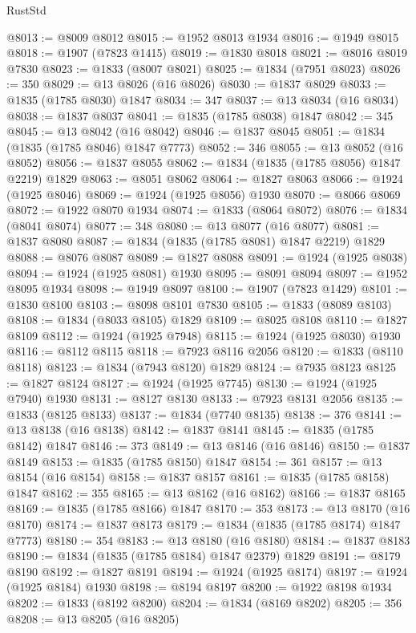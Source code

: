 \begin{lexlean}{RustStd}
\begin{coremodule}
{\begin{coremodule}
{{{{{@8013 := @8009 @8012
@8015 := @1952 @8013 @1934
@8016 := @1949 @8015
@8018 := @1907 (@7823 @1415)
@8019 := @1830 @8018
@8021 := @8016 @8019 @7830
@8023 := @1833 (@8007 @8021)
@8025 := @1834 (@7951 @8023)
@8026 := 350
@8029 := @13 @8026 (@16 @8026)
@8030 := @1837 @8029
@8033 := @1835 (@1785 @8030) @1847
@8034 := 347
@8037 := @13 @8034 (@16 @8034)
@8038 := @1837 @8037
@8041 := @1835 (@1785 @8038) @1847
@8042 := 345
@8045 := @13 @8042 (@16 @8042)
@8046 := @1837 @8045
@8051 := @1834 (@1835 (@1785 @8046) @1847 @7773)
@8052 := 346
@8055 := @13 @8052 (@16 @8052)
@8056 := @1837 @8055
@8062 := @1834 (@1835 (@1785 @8056) @1847 @2219) @1829
@8063 := @8051 @8062
@8064 := @1827 @8063
@8066 := @1924 (@1925 @8046)
@8069 := @1924 (@1925 @8056) @1930
@8070 := @8066 @8069
@8072 := @1922 @8070 @1934
@8074 := @1833 (@8064 @8072)
@8076 := @1834 (@8041 @8074)
@8077 := 348
@8080 := @13 @8077 (@16 @8077)
@8081 := @1837 @8080
@8087 := @1834 (@1835 (@1785 @8081) @1847 @2219) @1829
@8088 := @8076 @8087
@8089 := @1827 @8088
@8091 := @1924 (@1925 @8038)
@8094 := @1924 (@1925 @8081) @1930
@8095 := @8091 @8094
@8097 := @1952 @8095 @1934
@8098 := @1949 @8097
@8100 := @1907 (@7823 @1429)
@8101 := @1830 @8100
@8103 := @8098 @8101 @7830
@8105 := @1833 (@8089 @8103)
@8108 := @1834 (@8033 @8105) @1829
@8109 := @8025 @8108
@8110 := @1827 @8109
@8112 := @1924 (@1925 @7948)
@8115 := @1924 (@1925 @8030) @1930
@8116 := @8112 @8115
@8118 := @7923 @8116 @2056
@8120 := @1833 (@8110 @8118)
@8123 := @1834 (@7943 @8120) @1829
@8124 := @7935 @8123
@8125 := @1827 @8124
@8127 := @1924 (@1925 @7745)
@8130 := @1924 (@1925 @7940) @1930
@8131 := @8127 @8130
@8133 := @7923 @8131 @2056
@8135 := @1833 (@8125 @8133)
@8137 := @1834 (@7740 @8135)
@8138 := 376
@8141 := @13 @8138 (@16 @8138)
@8142 := @1837 @8141
@8145 := @1835 (@1785 @8142) @1847
@8146 := 373
@8149 := @13 @8146 (@16 @8146)
@8150 := @1837 @8149
@8153 := @1835 (@1785 @8150) @1847
@8154 := 361
@8157 := @13 @8154 (@16 @8154)
@8158 := @1837 @8157
@8161 := @1835 (@1785 @8158) @1847
@8162 := 355
@8165 := @13 @8162 (@16 @8162)
@8166 := @1837 @8165
@8169 := @1835 (@1785 @8166) @1847
@8170 := 353
@8173 := @13 @8170 (@16 @8170)
@8174 := @1837 @8173
@8179 := @1834 (@1835 (@1785 @8174) @1847 @7773)
@8180 := 354
@8183 := @13 @8180 (@16 @8180)
@8184 := @1837 @8183
@8190 := @1834 (@1835 (@1785 @8184) @1847 @2379) @1829
@8191 := @8179 @8190
@8192 := @1827 @8191
@8194 := @1924 (@1925 @8174)
@8197 := @1924 (@1925 @8184) @1930
@8198 := @8194 @8197
@8200 := @1922 @8198 @1934
@8202 := @1833 (@8192 @8200)
@8204 := @1834 (@8169 @8202)
@8205 := 356
@8208 := @13 @8205 (@16 @8205)
}}}}}
\end{coremodule}}
\end{coremodule}
\end{lexlean}
